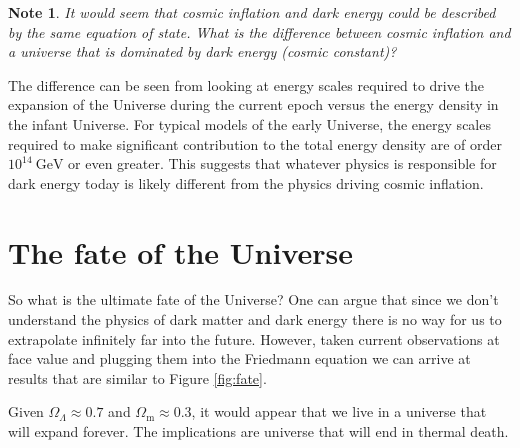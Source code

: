 \documentclass[a4paper,12pt]{article}
\theoremstyle{remark}
\newcommand{\mrm}[1]{\mathrm{#1}}
\renewcommand{\=}[1]{\stackrel{#1}{=}} %
\theoremstyle{plain}
\theoremstyle{definition}
\newtheorem*{definitionT}{Note}%
\newenvironment{note}{
\begin{dBox}
\begin{definitionT}}
{\end{definitionT}
\end{dBox}}
\begin{document}
\begin{note}
\textit{It would seem that cosmic inflation and dark energy could be described by the same equation of state. What is the difference between cosmic inflation and a universe that is dominated by dark energy (cosmic constant)? }

The difference can be seen from looking at energy scales required to drive the expansion of the Universe during the current epoch versus the energy density in the infant Universe. For typical models of the early Universe, the energy scales required to make significant contribution to the total energy density are of order $10^{14} \:\mrm{GeV}$ or even greater. This suggests that whatever physics is responsible for dark energy today is likely different from the physics driving cosmic inflation. 
\end{note}

\section{The fate of the Universe}
So what is the ultimate fate of the Universe? One can argue that since we don't understand the physics of dark matter and dark energy there is no way for us to extrapolate infinitely far into the future. However, taken current observations at face value and plugging them into the Friedmann equation we can arrive at results that are similar to Figure \ref{fig:fate}. 

Given $\Omega _\Lambda \approx 0.7$ and $\Omega _\mrm{m} \approx 0.3$, it would appear that we live in a universe that will expand forever. The implications are universe that will end in thermal death. 
\end{document}
